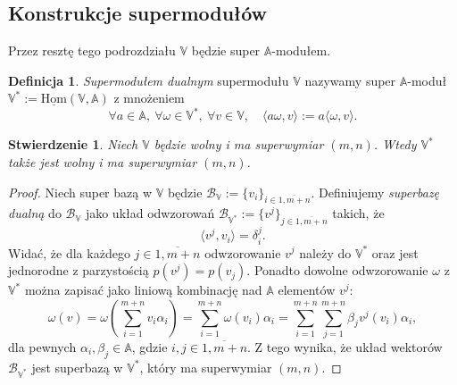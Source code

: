 \documentclass[11pt,a4paper]{report}
\newtheorem{proposition}[theorem]{Stwierdzenie}
\theoremstyle{definition}
\newtheorem{definition}[theorem]{Definicja}
\begin{document}
\subsection{Konstrukcje supermodułów}

Przez resztę tego podrozdziału $\mathbb{V}$ będzie super $\mathbb{A}$-modułem.

\begin{definition} 
\textit{Supermodułem dualnym} supermodułu $\mathbb{V}$ nazywamy super $\mathbb{A}$-moduł $\mathbb{V}^* := \underline{\mathrm{Hom}}(\mathbb{V},\mathbb{A})$ z mnożeniem
\begin{equation}
\label{dual_supermodule_multiplication}
 \forall a \in \mathbb{A},\ \forall \omega \in \mathbb{V}^*,\ \forall v \in \mathbb{V}, \quad \langle a \omega, v \rangle := a \langle \omega , v \rangle.
\end{equation}
\end{definition}

\begin{proposition}
Niech $\mathbb{V}$ będzie wolny i ma superwymiar $(m,n)$. Wtedy $\mathbb{V}^*$ także jest wolny i ma superwymiar $(m,n)$.
\end{proposition}

\begin{proof}
 Niech super bazą w $\mathbb{V}$ będzie $\mathcal{B}_\mathbb{V} := \{ v_i \}_{i \in \overline{1,m+n}}$. Definiujemy \textit{superbazę dualną} do $\mathcal{B}_\mathbb{V}$ jako układ odwzorowań $\mathcal{B}_{\mathbb{V}^*}:=\{ v^j\}_{j \in \overline{1,m+n}}$ takich, że 
 \begin{equation*}
 \langle v^j, v_i \rangle = \delta^j_i.
 \end{equation*}
 Widać, że dla każdego $j \in \overline{1,m+n}$ odwzorowanie $v^j$ należy do $\mathbb{V^*}$ oraz jest jednorodne z parzystością $p(v^j) = p(v_j)$. Ponadto dowolne odwzorowanie $\omega$ z $\mathbb{V^*}$ można zapisać jako liniową kombinację nad $\mathbb{A}$ elementów $v^j$:
 \begin{equation*}
  \omega(v) = \omega \left( \sum^{m+n}_{i=1} v_i \alpha_i \right) = \sum^{m+n}_{i=1} \omega(v_i) \alpha_i = \sum^{m+n}_{i=1} \sum^{m+n}_{j=1} \beta_j v^j(v_i) \alpha_i,
 \end{equation*}
 dla pewnych $\alpha_i, \beta_j \in \mathbb{A}$, gdzie $i,j \in \overline{1,m+n}.$ Z tego wynika, że układ wektorów $\mathcal{B}_{\mathbb{V}^*}$ jest superbazą w $\mathbb{V}^*$, który ma superwymiar $(m,n)$.
\end{proof}
\end{document}
